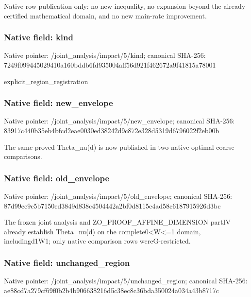 \documentclass[10pt,a4paper]{article}
\begin{document}
\begingroup\raggedright\sloppy Native row publication only:\allowbreak{} no new inequality,\allowbreak{} no expansion beyond the already certified mathematical domain,\allowbreak{} and no new main-rate improvement.\par\endgroup

\subsubsection{Native field: kind}
Native pointer: /joint\_\allowbreak{}analysis/impact/5/kind; canonical SHA-256: 7249f099445029410a160bddb6fd935004aff56d921f462672a9f41815a78001

\begingroup\raggedright\sloppy explicit\_\allowbreak{}region\_\allowbreak{}registration\par\endgroup

\subsubsection{Native field: new\_\allowbreak{}envelope}
Native pointer: /joint\_\allowbreak{}analysis/impact/5/new\_\allowbreak{}envelope; canonical SHA-256: 83917c440b35eb4bfcd2eae0030ed38242d9c872e328d5319d6796022f2eb00b

\begingroup\raggedright\sloppy The same proved Theta\_\allowbreak{}nu(d) is now published in two native optimal coarse comparisons.\par\endgroup

\subsubsection{Native field: old\_\allowbreak{}envelope}
Native pointer: /joint\_\allowbreak{}analysis/impact/5/old\_\allowbreak{}envelope; canonical SHA-256: 87d99ec9c5b7150ed3849d838c4504442a2bf0d8115e4ad58c6187915926d3bc

\begingroup\raggedright\sloppy The frozen joint analysis and ZO\_\allowbreak{}PROOF\_\allowbreak{}AFFINE\_\allowbreak{}DIMENSION partIV already establish Theta\_\allowbreak{}nu(d) on the complete0<W<=\allowbreak{}1 domain,\allowbreak{} includingd1W1;\allowbreak{} only native comparison rows wereG-restricted.\par\endgroup

\subsubsection{Native field: unchanged\_\allowbreak{}region}
Native pointer: /joint\_\allowbreak{}analysis/impact/5/unchanged\_\allowbreak{}region; canonical SHA-256: ae88cd7a279cf69f0b2b4b906638216d5c38ec8c36bda350024a034a43b8717c
\end{document}
